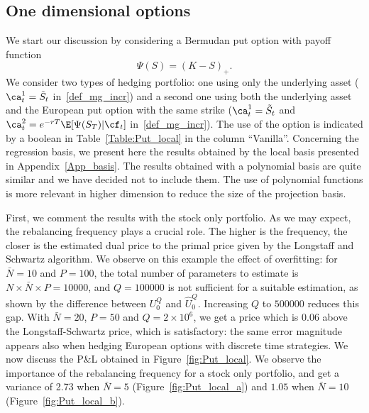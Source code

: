 \subsection{One dimensional options}\label{subsec_num1d}

We start our discussion by considering a Bermudan put option with payoff function
$$ \Psi(S) = (K - S)_+.$$
We consider two types of hedging portfolio: one using only the underlying asset ($\ca^1_t=\tilde{S}_t$ in~\eqref{def_mg_incr}) and a second one using both the underlying asset and the European put option with the same strike ($\ca^1_t=\tilde{S}_t$ and $\ca^2_t=e^{-rT }\E[\Psi(S_T)|\cf_t]$ in~\eqref{def_mg_incr}). The use of the option is indicated by a boolean in Table~\ref{Table:Put_local} in the column ``Vanilla''. Concerning the regression basis, we present here the results obtained by the local basis presented in Appendix~\ref{App_basis}. The results obtained with a polynomial basis are quite similar and we have decided not to include them. The use of polynomial functions is more relevant in higher dimension to reduce the size of the projection basis.



First, we comment the results with the stock only portfolio. As we may expect, the rebalancing frequency plays a crucial role. The higher is the frequency, the closer is the estimated dual price to the primal price given by the Longstaff and Schwartz algorithm. 
We observe on this example the effect of overfitting: for $\bar{N}=10$ and $P=100$, the total number of parameters to estimate is $N\times\bar{N}\times P=10000$, and $Q=100000$ is not sufficient for a suitable estimation, as shown by the difference between $U_0^Q$ and $\hat{U}_0^Q$. Increasing $Q$ to $500000$ reduces this gap. With $\bar{N}=20$, $P=50$ and $Q=2\times 10^6$, we get a price which is $0.06$ above the Longstaff-Schwartz price, which is satisfactory: the same error magnitude appears also when hedging European options with discrete time strategies. We now discuss the P\&L obtained in Figure~\ref{fig:Put_local}. We observe the importance of the rebalancing frequency for a stock only portfolio, and get a variance of 2.73 when $\bar{N}=5$ (Figure~\ref{fig:Put_local_a}) and $1.05$ when $\bar{N}=10$ (Figure~\ref{fig:Put_local_b}). 






